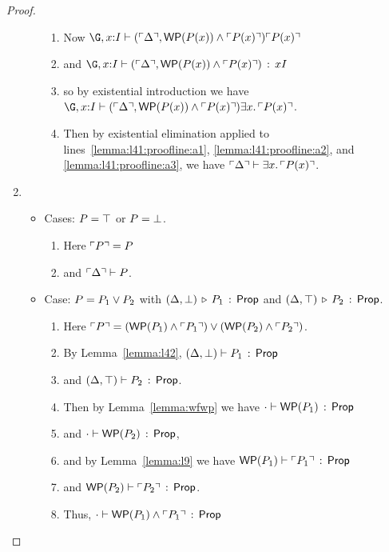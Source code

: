 \documentclass[10pt,letter]{article}
\begin{document}
\begin{proof}
\begin{enumerate}
\begin{itemize}
\begin{enumerate}
     \item 
       Now 
       $\jpf{\G,\x{:}\I}{(\trans\D,\pAnd{\wp{\p(\x)}}{\trans{\p(\x)}})}{\trans{\p(\x)}}$
     \item
       and
       $\jwfterm{\G,\x{:}\I}{(\trans\D,\pAnd{\wp{\p(\x)}}{\trans{\p(\x)}})}{\x}{\I}$
     \item 
       \label{lemma:l41:proofline:a3}
       so by existential introduction we have 
       $\jpf{\G,\x{:}\I}{(\trans\D,\pAnd{\wp{\p(\x)}}{\trans{\p(\x)}})}{\pExists{\x}{\I}{\trans{\p(\x)}}}$.
     \item
       Then by existential elimination 
       applied to lines~\ref{lemma:l41:proofline:a1}, \ref{lemma:l41:proofline:a2}, and \ref{lemma:l41:proofline:a3}, 
       we have
       $\ulcorner \Delta \urcorner \vdash \exists x.\, \ulcorner P(x) \urcorner$.
     \end{enumerate}
  \end{itemize}
\item %
  \begin{itemize}
  \item Cases: $P = \top$ or $P = \bot$.
    \begin{enumerate}
    \item 
      Here $\ulcorner P \urcorner = P$ 
    \item
      and $\ulcorner \Delta \urcorner \vdash P$.
    \end{enumerate}
  \item Case: $P = P_1 \vee P_2$ with
    $(\Delta,\bot) \,\triangleright\, P_1\,:\, \mathsf{Prop}$ and
    $(\Delta,\top) \,\triangleright\, P_2\,:\, \mathsf{Prop}$.
    \begin{enumerate}
    \item 
      Here $\ulcorner P \urcorner = 
      (\mathop{\mathsf{WP}}(P_1) \wedge \ulcorner P_1 \urcorner) \vee (\mathop{\mathsf{WP}}(P_2) \wedge \ulcorner P_2 \urcorner)$.
    \item 
      By Lemma~\ref{lemma:l42},
      $(\Delta,\bot) \vdash P_1\, :\, \mathsf{Prop}$ 
    \item 
      and
      $(\Delta,\top) \vdash P_2\, :\, \mathsf{Prop}$.
    \item
      Then by Lemma~\ref{lemma:wfwp} we have
      $\cdot \vdash \mathop{\mathsf{WP}}(P_1)\, :\, \mathsf{Prop}$
    \item 
      and 
      $\cdot \vdash \mathop{\mathsf{WP}}(P_2)\, :\, \mathsf{Prop}$,
    \item 
      and by Lemma~\ref{lemma:l9} we have
      $\mathop{\mathsf{WP}}(P_1) \vdash \ulcorner P_1 \urcorner\, :\, \mathsf{Prop}$
    \item 
      and
      $\mathop{\mathsf{WP}}(P_2) \vdash \ulcorner P_2 \urcorner\, :\, \mathsf{Prop}$.
    \item 
      Thus,
      $\cdot \vdash \mathop{\mathsf{WP}}(P_1) \wedge \ulcorner P_1 \urcorner\, :\, \mathsf{Prop}$

\end{enumerate}
\end{itemize}
\end{enumerate}
\end{proof}
\end{document}
